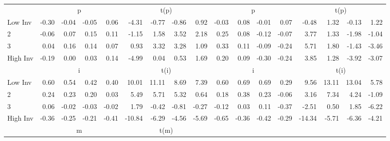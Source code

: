 \begin{table}[!ht]
\begin{tabular}{lrrrrrrrrrrrrrrrr}
  
    
      & \multicolumn{4}{c}{p} & \multicolumn{4}{c}{t(p)}
    
      & \multicolumn{4}{c}{p} & \multicolumn{4}{c}{t(p)}
    
    \\
      \cmidrule(r){2-5} \cmidrule(r){6-9} \cmidrule(r){10-13} \cmidrule(r){14-17}

    Low Inv   & -0.30  & -0.04  & -0.05  & 0.06  & -4.31  & -0.77  & -0.86  & 0.92  & -0.03  & 0.08  & -0.01  & 0.07  & -0.48  & 1.32  & -0.13  & 1.22  \\
           2  & -0.06  & 0.07  & 0.15  & 0.11  & -1.15  & 1.58  & 3.52  & 2.18  & 0.25  & 0.08  & -0.12  & -0.07  & 3.77  & 1.33  & -1.98  & -1.04  \\
           3  & 0.04  & 0.16  & 0.14  & 0.07  & 0.93  & 3.32  & 3.28  & 1.09  & 0.33  & 0.11  & -0.09  & -0.24  & 5.71  & 1.80  & -1.43  & -3.46  \\
    High Inv  & -0.19  & 0.00  & 0.03  & 0.14  & -4.99  & 0.04  & 0.53  & 1.69  & 0.20  & 0.09  & -0.30  & -0.24  & 3.85  & 1.28  & -3.92  & -3.07  \\

  
    
      & \multicolumn{4}{c}{i} & \multicolumn{4}{c}{t(i)}
    
      & \multicolumn{4}{c}{i} & \multicolumn{4}{c}{t(i)}
    
    \\
      \cmidrule(r){2-5} \cmidrule(r){6-9} \cmidrule(r){10-13} \cmidrule(r){14-17}

    Low Inv   & 0.60  & 0.54  & 0.42  & 0.40  & 10.01  & 11.11  & 8.69  & 7.39  & 0.60  & 0.69  & 0.69  & 0.29  & 9.56  & 13.11  & 13.04  & 5.78  \\
           2  & 0.24  & 0.23  & 0.20  & 0.03  & 5.49  & 5.71  & 5.32  & 0.64  & 0.18  & 0.38  & 0.23  & -0.06  & 3.16  & 7.34  & 4.24  & -1.09  \\
           3  & 0.06  & -0.02  & -0.03  & -0.02  & 1.79  & -0.42  & -0.81  & -0.27  & -0.12  & 0.03  & 0.11  & -0.37  & -2.51  & 0.50  & 1.85  & -6.22  \\
    High Inv  & -0.36  & -0.25  & -0.21  & -0.41  & -10.84  & -6.29  & -4.56  & -5.69  & -0.65  & -0.36  & -0.42  & -0.29  & -14.34  & -5.71  & -6.36  & -4.21  \\

  
    
      & \multicolumn{4}{c}{m} & \multicolumn{4}{c}{t(m)}
    

\end{tabular}
\end{table}
